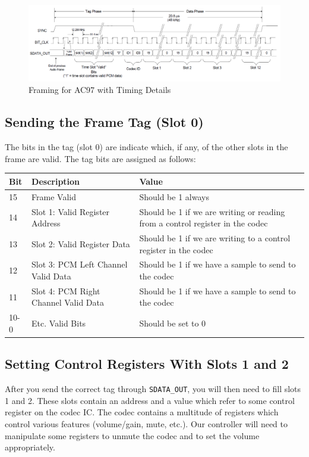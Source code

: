 \documentclass[11pt]{article}
\begin{document}
\begin{figure}[hbt]
	\begin{center}
		\includegraphics[width=6in]{ac97_framing_detail}
		\caption{Framing for AC97 with Timing Details}
	\end{center}
\end{figure}

\subsection{Sending the Frame Tag (Slot 0)}

The bits in the tag (slot 0) are indicate which, if any, of the other slots in the frame are valid. The tag bits are assigned as follows:

\renewcommand{\arraystretch}{1.1}
\begin{center}
	\begin{tabular}{ | l | l | p{8cm} |}
		\hline
		\textbf{Bit} & \textbf{Description} & \textbf{Value} \\ \hline
		15 & Frame Valid & Should be 1 always  \\ \hline
		14 & Slot 1: Valid Register Address & Should be 1 if we are writing or reading from a control register in the codec  \\ \hline
		13 & Slot 2: Valid Register Data & Should be 1 if we are writing to a control register in the codec \\ \hline
		12 & Slot 3: PCM Left Channel Valid Data & Should be 1 if we have a sample to send to the codec  \\ \hline
		11 & Slot 4: PCM Right Channel Valid Data & Should be 1 if we have a sample to send to the codec  \\ \hline
		10-0 & Etc. Valid Bits & Should be set to 0 \\ \hline		
	\end{tabular}
\end{center}

\subsection{Setting Control Registers With Slots 1 and 2}
After you send the correct tag through \verb|SDATA_OUT|, you will then need to fill slots 1 and 2. These slots contain an address and a value which refer to some control register on the codec IC. The codec contains a multitude of registers which control various features (volume/gain, mute, etc.). Our controller will need to manipulate some registers to unmute the codec and to set the volume appropriately.
\end{document}
